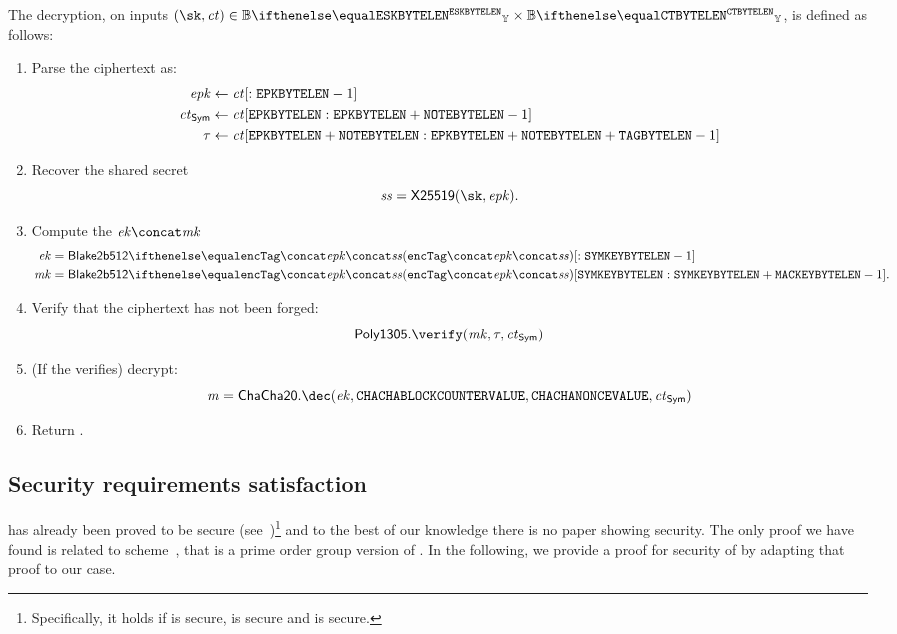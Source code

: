 The decryption, on inputs $(\sk, \ct) \in \BBy{\eskByteLen} \times \BBy{\ctByteLen}$, is defined as follows:
\begin{enumerate}
    \item Parse the ciphertext \ct{} as:
    \begin{align*}
        \mathit{epk} &\gets \mathit{ct}[: \mathtt{EPKBYTELEN}-1]\\
        \mathit{ct}_{\mathsf{Sym}} &\gets \mathit{ct}[\mathtt{EPKBYTELEN}: \mathtt{EPKBYTELEN} + \mathtt{NOTEBYTELEN}-1]\\
        \tau &\gets \mathit{ct}[\mathtt{EPKBYTELEN} + \mathtt{NOTEBYTELEN}: \mathtt{EPKBYTELEN} + \mathtt{NOTEBYTELEN} + \mathtt{TAGBYTELEN} -1]
    \end{align*}
    \item Recover the shared secret
    \[
        \sharedSecret = \xscalarmult{25519}(\sk, \epk).
    \]
    \item Compute the $\ek{}\concat\mk$
    \begin{align*}
        \ek &= \blake{2b512}{\encTag \concat \epk \concat\sharedSecret}[: \symKeyByteLen - 1]\\
        \mk &= \blake{2b512}{\encTag \concat \epk \concat\sharedSecret}[\symKeyByteLen: \symKeyByteLen + \macKeyByteLen - 1].
    \end{align*}
    \item Verify that the ciphertext has not been forged:
    \[
        \polymac{1305}.\verify(\mk, \tau, \ct_{\sym})
    \]
    \item (If the \mac{} verifies) decrypt:
    \[
        \msg = \chacha{20}.\dec(\ek, \chachaBlockCounterValue, \chachaNonceValue, \ct_{\sym})
    \]
    \item Return \msg.
\end{enumerate}

\subsection{Security requirements satisfaction}\label{instantiation:enc:security}

\dhaes{} has already been proved to be \indccaii{} secure (see~\cite[Section 3.5, Theorem 6]{abdalla1999dhaes})\footnote{Specifically, it holds if \sym{} is \indcpa{} secure, \hash{} is \hdhi{} secure and \mac{} is \sufcma{} secure.} and to the best of our knowledge there is no paper showing \ikcca{} security. The only proof we have found is related to \dhies{} scheme~\cite{abdalla2010robust}, that is a prime order group version of \dhaes{}. In the following, we provide a proof for \ikcca{} security of \dhaes{} by adapting that proof to our case.

